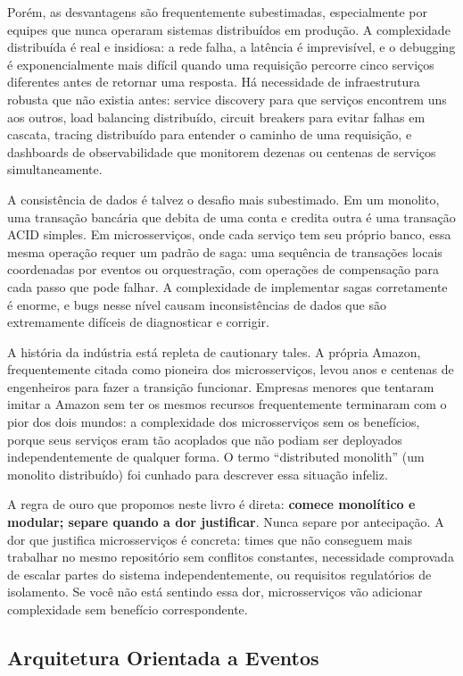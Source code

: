 Porém, as desvantagens são frequentemente subestimadas, especialmente por
equipes que nunca operaram sistemas distribuídos em produção. A complexidade
distribuída é real e insidiosa: a rede falha, a latência é imprevisível, e
o debugging é exponencialmente mais difícil quando uma requisição percorre
cinco serviços diferentes antes de retornar uma resposta. Há necessidade de
infraestrutura robusta que não existia antes: service discovery para que
serviços encontrem uns aos outros, load balancing distribuído, circuit
breakers para evitar falhas em cascata, tracing distribuído para entender
o caminho de uma requisição, e dashboards de observabilidade que monitorem
dezenas ou centenas de serviços simultaneamente.

A consistência de dados é talvez o desafio mais subestimado. Em um monolito,
uma transação bancária que debita de uma conta e credita outra é uma
transação ACID simples. Em microsserviços, onde cada serviço tem seu próprio
banco, essa mesma operação requer um padrão de saga: uma sequência de
transações locais coordenadas por eventos ou orquestração, com operações de
compensação para cada passo que pode falhar. A complexidade de implementar
sagas corretamente é enorme, e bugs nesse nível causam inconsistências de
dados que são extremamente difíceis de diagnosticar e corrigir.

A história da indústria está repleta de cautionary tales. A própria Amazon,
frequentemente citada como pioneira dos microsserviços, levou anos e centenas
de engenheiros para fazer a transição funcionar. Empresas menores que tentaram
imitar a Amazon sem ter os mesmos recursos frequentemente terminaram com o
pior dos dois mundos: a complexidade dos microsserviços sem os benefícios,
porque seus serviços eram tão acoplados que não podiam ser deployados
independentemente de qualquer forma. O termo ``distributed monolith'' (um
monolito distribuído) foi cunhado para descrever essa situação
infeliz.

A regra de ouro que propomos neste livro é direta: \textbf{comece monolítico e
modular; separe quando a dor justificar}. Nunca separe por antecipação. A dor
que justifica microsserviços é concreta: times que não conseguem mais trabalhar
no mesmo repositório sem conflitos constantes, necessidade comprovada de escalar
partes do sistema independentemente, ou requisitos regulatórios de isolamento.
Se você não está sentindo essa dor, microsserviços vão adicionar complexidade
sem benefício correspondente.

\subsection{Arquitetura Orientada a Eventos}

